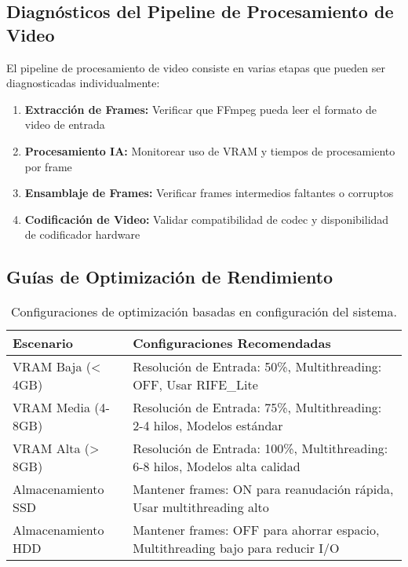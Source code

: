 \documentclass[11pt, a4paper]{article}
\begin{document}
\subsection{Diagnósticos del Pipeline de Procesamiento de Video}
El pipeline de procesamiento de video consiste en varias etapas que pueden ser diagnosticadas individualmente:
\begin{enumerate}[leftmargin=*]
    \item \textbf{Extracción de Frames:} Verificar que FFmpeg pueda leer el formato de video de entrada
    \item \textbf{Procesamiento IA:} Monitorear uso de VRAM y tiempos de procesamiento por frame
    \item \textbf{Ensamblaje de Frames:} Verificar frames intermedios faltantes o corruptos
    \item \textbf{Codificación de Video:} Validar compatibilidad de codec y disponibilidad de codificador hardware
\end{enumerate}

\subsection{Guías de Optimización de Rendimiento}
\begin{table}[H]
    \centering
    \small
    \begin{tabularx}{\textwidth}{l X}
        \toprule
        \textbf{Escenario} & \textbf{Configuraciones Recomendadas} \\
        \midrule
        VRAM Baja (< 4GB) & Resolución de Entrada: 50\%, Multithreading: OFF, Usar RIFE\_Lite \\
        VRAM Media (4-8GB) & Resolución de Entrada: 75\%, Multithreading: 2-4 hilos, Modelos estándar \\
        VRAM Alta (> 8GB) & Resolución de Entrada: 100\%, Multithreading: 6-8 hilos, Modelos alta calidad \\
        Almacenamiento SSD & Mantener frames: ON para reanudación rápida, Usar multithreading alto \\
        Almacenamiento HDD & Mantener frames: OFF para ahorrar espacio, Multithreading bajo para reducir I/O \\
        \bottomrule
    \end{tabularx}
    \caption{Configuraciones de optimización basadas en configuración del sistema.}
\end{table}
\end{document}
